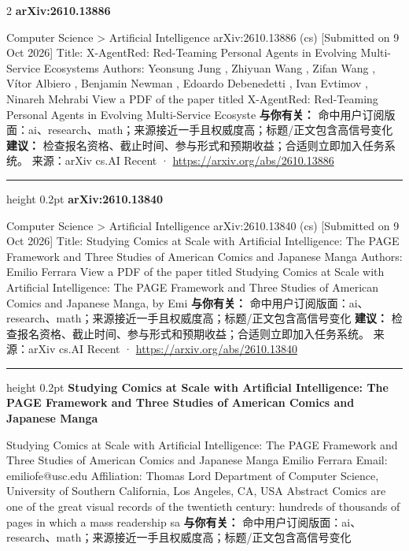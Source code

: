\documentclass[10.5pt]{ctexart}
\begin{document}
\begin{multicols}{2}
{\large\bfseries arXiv:2610.13886}\par
Computer Science > Artificial Intelligence arXiv:2610.13886 (cs) [Submitted on 9 Oct 2026] Title: X-AgentRed: Red-Teaming Personal Agents in Evolving Multi-Service Ecosystems Authors: Yeonsung Jung , Zhiyuan Wang , Zifan Wang , Vítor Albiero , Benjamin Newman , Edoardo Debenedetti , Ivan Evtimov , Ninareh Mehrabi View a PDF of the paper titled X-AgentRed: Red-Teaming Personal Agents in Evolving Multi-Service Ecosyste
\textbf{与你有关：} 命中用户订阅版面：ai、research、math；来源接近一手且权威度高；标题/正文包含高信号变化
\textbf{建议：} 检查报名资格、截止时间、参与形式和预期收益；合适则立即加入任务系统。
{\footnotesize\color{ormuted} 来源：arXiv cs.AI Recent · \url{https://arxiv.org/abs/2610.13886}}
\vspace{2mm}
\hrule height 0.2pt
\vspace{2mm}
{\large\bfseries arXiv:2610.13840}\par
Computer Science > Artificial Intelligence arXiv:2610.13840 (cs) [Submitted on 9 Oct 2026] Title: Studying Comics at Scale with Artificial Intelligence: The PAGE Framework and Three Studies of American Comics and Japanese Manga Authors: Emilio Ferrara View a PDF of the paper titled Studying Comics at Scale with Artificial Intelligence: The PAGE Framework and Three Studies of American Comics and Japanese Manga, by Emi
\textbf{与你有关：} 命中用户订阅版面：ai、research、math；来源接近一手且权威度高；标题/正文包含高信号变化
\textbf{建议：} 检查报名资格、截止时间、参与形式和预期收益；合适则立即加入任务系统。
{\footnotesize\color{ormuted} 来源：arXiv cs.AI Recent · \url{https://arxiv.org/abs/2610.13840}}
\vspace{2mm}
\hrule height 0.2pt
\vspace{2mm}
{\large\bfseries Studying Comics at Scale with Artificial Intelligence: The PAGE Framework and Three Studies of American Comics and Japanese Manga}\par
Studying Comics at Scale with Artificial Intelligence: The PAGE Framework and Three Studies of American Comics and Japanese Manga Emilio Ferrara Email: emiliofe@usc.edu Affiliation: Thomas Lord Department of Computer Science, University of Southern California, Los Angeles, CA, USA Abstract Comics are one of the great visual records of the twentieth century: hundreds of thousands of pages in which a mass readership sa
\textbf{与你有关：} 命中用户订阅版面：ai、research、math；来源接近一手且权威度高；标题/正文包含高信号变化

\end{multicols}
\end{document}

